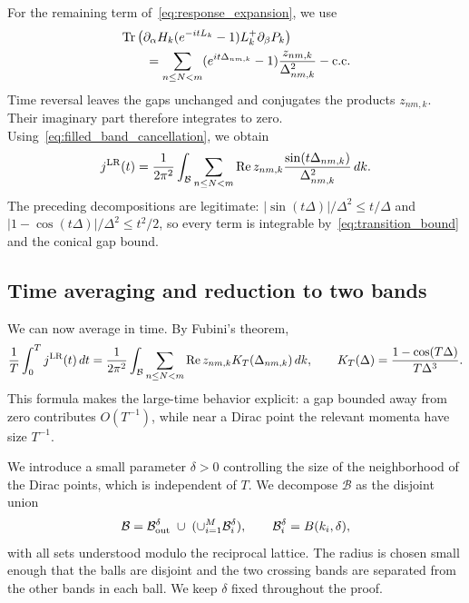 \documentclass[a4paper,11pt]{article}
\theoremstyle{plain}
\theoremstyle{remark}
\begin{document}
For the remaining term of~\eqref{eq:response_expansion}, we use
\begin{align*}
&\Tr\left(\partial_\alpha H_k(e^{-itL_k}-1)L_k^+\partial_\beta P_k\right)\\
&\qquad=\sum_{n\le N<m}(e^{it\Delta_{nm,k}}-1)
\frac{z_{nm,k}}{\Delta_{nm,k}^2}-{\rm c.c.}
\end{align*}
Time reversal leaves the gaps unchanged and conjugates the products
$z_{nm,k}$. Their imaginary part therefore integrates to zero.
Using~\eqref{eq:filled_band_cancellation}, we obtain
\begin{equation}\label{eq:linear_response_current}
j^{\rm LR}(t)=\frac1{2\pi^2}\int_{\mathcal B}
\sum_{n\le N<m}\operatorname{Re}z_{nm,k}
\frac{\sin(t\Delta_{nm,k})}{\Delta_{nm,k}^2}\,dk.
\end{equation}
The preceding decompositions are legitimate:
$|\sin(t\Delta)|/\Delta^2\le t/\Delta$ and
$|1-\cos(t\Delta)|/\Delta^2\le t^2/2$, so every term is integrable
by~\eqref{eq:transition_bound} and the conical gap bound.

\subsection{Time averaging and reduction to two bands}
\label{sec:dirac_reduc}

We can now average in time. By Fubini's theorem,
\begin{equation}\label{eq:averaged_response}
\frac1T\int_0^Tj^{\rm LR}(t)\,dt
=\frac1{2\pi^2}\int_{\mathcal B}
\sum_{n\le N<m}\operatorname{Re}z_{nm,k}K_T(\Delta_{nm,k})\,dk,
\qquad K_T(\Delta)=\frac{1-\cos(T\Delta)}{T\Delta^3}.
\end{equation}
This formula makes the large-time behavior explicit: a gap bounded
away from zero contributes $O(T^{-1})$, while near a Dirac point the
relevant momenta have size $T^{-1}$.

\medskip

We introduce a small parameter $\delta>0$ controlling the size of the
neighborhood of the Dirac points, which is independent of $T$.
We decompose $\mathcal B$ as the disjoint union
\[
\mathcal B=\mathcal B_{\rm out}^{\delta}
\;\cup\;(\cup_{i=1}^M\mathcal B_i^\delta),
\qquad \mathcal B_i^\delta=B(k_i,\delta),
\]
with all sets understood modulo the reciprocal lattice. The radius is
chosen small enough that the balls are disjoint and the two crossing
bands are separated from the other bands in each ball.
We keep $\delta$ fixed throughout the proof.
\end{document}
